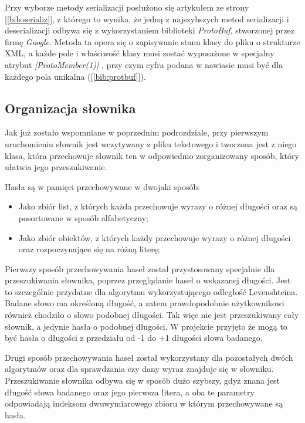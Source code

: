 Przy wyborze metody serializacji posłużono się artykułem ze strony [\ref{bib:serializ}], z którego to wynika, że jedną z najszybszych metod serializacji i deserializacji odbywa się z wykorzystaniem biblioteki \textit{ProtoBuf}, stworzonej przez firmę \textit{Google}. Metoda ta opera się o zapisywanie stanu klasy do pliku o strukturze XML, a każde pole i właściwość klasy musi zostać wyposażone w specjalny atrybut \textit{[ProtoMember(1)]} , przy czym cyfra podana w nawiasie musi być dla każdego pola unikalna ([\ref{bib:protbuf}]).

\subsection{Organizacja słownika}

Jak już zostało wspomniane w poprzednim podrozdziale, przy pierwszym uruchomieniu słownik jest wczytywany z pliku tekstowego i tworzona jest z niego klasa, która przechowuje słownik ten w odpowiednio zorganizowany sposób, który ułatwia jego przeszukiwanie. 

Hasła są w pamięci przechowywane w dwojaki sposób:
\begin{itemize}
	\item Jako zbiór list, z których każda przechowuje wyrazy o różnej długości oraz są posortowane w sposób alfabetyczny;
	\item Jako zbiór obiektów, z których każdy przechowuje wyrazy o różnej długości oraz rozpoczynające się na różną literę;
\end{itemize}

Pierwszy sposób przechowywania haseł został przystosowany specjalnie dla przeszukiwania słownika, poprzez przeglądanie haseł o wskazanej długości. Jest to szczególnie przydatne dla algorytmu wykorzystującego odległość Levenshteina. Badane słowo ma określoną długość, a zatem prawdopodobnie użytkownikowi również chodziło o słowo podobnej długości. Tak więc nie jest przeszukiwany cały słownik, a jedynie hasła o podobnej długości. W projekcie przyjęto że mogą to być hasła o długości z przedziału od -1 do +1 długości słowa badanego.

Drugi sposób przechowywania haseł został wykorzystany dla pozostałych dwóch algorytmów oraz dla sprawdzania czy dany wyraz znajduje się w słowniku. Przeszukiwanie słownika odbywa się w sposób dużo szybszy, gdyż znana jest długość słowa badanego oraz jego pierwsza litera, a oba te parametry odpowiadają indeksom dwuwymiarowego zbioru w którym przechowywane są hasła.

